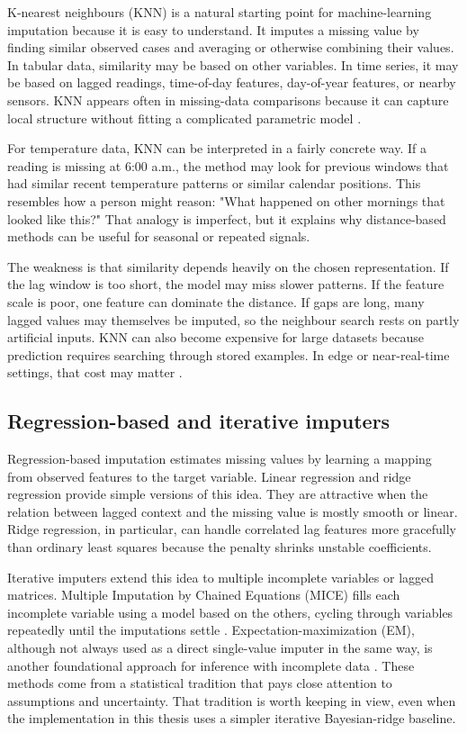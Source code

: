 K-nearest neighbours (KNN) is a natural starting point for machine-learning imputation because it is easy to understand. It imputes a missing value by finding similar observed cases and averaging or otherwise combining their values. In tabular data, similarity may be based on other variables. In time series, it may be based on lagged readings, time-of-day features, day-of-year features, or nearby sensors. KNN appears often in missing-data comparisons because it can capture local structure without fitting a complicated parametric model \cite{Raj2023MachineLB,Miao2023AnES}.

For temperature data, KNN can be interpreted in a fairly concrete way. If a reading is missing at 6:00 a.m., the method may look for previous windows that had similar recent temperature patterns or similar calendar positions. This resembles how a person might reason: "What happened on other mornings that looked like this?" That analogy is imperfect, but it explains why distance-based methods can be useful for seasonal or repeated signals.

The weakness is that similarity depends heavily on the chosen representation. If the lag window is too short, the model may miss slower patterns. If the feature scale is poor, one feature can dominate the distance. If gaps are long, many lagged values may themselves be imputed, so the neighbour search rests on partly artificial inputs. KNN can also become expensive for large datasets because prediction requires searching through stored examples. In edge or near-real-time settings, that cost may matter \cite{Erhan2021CriticalCO}.

\subsection{Regression-based and iterative imputers}

Regression-based imputation estimates missing values by learning a mapping from observed features to the target variable. Linear regression and ridge regression provide simple versions of this idea. They are attractive when the relation between lagged context and the missing value is mostly smooth or linear. Ridge regression, in particular, can handle correlated lag features more gracefully than ordinary least squares because the penalty shrinks unstable coefficients.

Iterative imputers extend this idea to multiple incomplete variables or lagged matrices. Multiple Imputation by Chained Equations (MICE) fills each incomplete variable using a model based on the others, cycling through variables repeatedly until the imputations settle \cite{VanBuuren2011}. Expectation-maximization (EM), although not always used as a direct single-value imputer in the same way, is another foundational approach for inference with incomplete data \cite{Dempster1997}. These methods come from a statistical tradition that pays close attention to assumptions and uncertainty. That tradition is worth keeping in view, even when the implementation in this thesis uses a simpler iterative Bayesian-ridge baseline.

